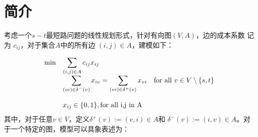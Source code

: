 



\clearpage

\section{简介}

考虑一个$s-t$最短路问题的线性规划形式，针对有向图$(V, A)$，边的成本系数
记为 $c_{ij}$，对于集合$A$中的所有边 $(i, j) \in A$，建模如下：

\begin{equation}
  \begin{array}{rll}
    \min& \displaystyle\sum_{(i,j) \in A} c_{ij} x_{ij}\\
    & \displaystyle\sum_{(iv)\in \delta^-(v)} x_{iv} = \sum_{(vi)\in
      \delta^+(v)} x_{vi}
       \mbox{\quad for all }v \in V\setminus\{s,t\} \\
       &  \\
    & x_{ij} \in \{0,1\}, \mbox{for all {i,j} in A}\\
  \end{array}\label{eq:shortestpath}
\end{equation}
%
其中，对于任意$v \in V$，定义$\delta^+(v) := {(v, i) \in A}$和
$\delta^-(v) := {(i, v) \in A}$。对于一个特定的图，模型可以具象表述为：

